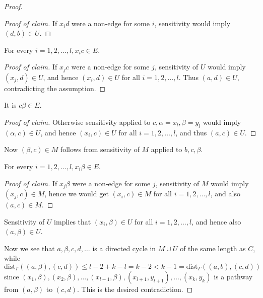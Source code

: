 \begin{proof}
	\begin{proof}[Proof of claim]
		If $x_i d$ were a non-edge for some $i$, sensitivity would imply $(d, b) \in U$.
	\end{proof}
	
	\begin{claim}
		For every $i = 1, 2, \dots , l, x_i c \in E$.
	\end{claim}
	
	\begin{proof}[Proof of claim]
		If $x_j c$ were a non-edge for some $j$, sensitivity of $U$ would imply $(x_j , d) \in U$, and hence $(x_i , d) \in U$ for all $i = 1, 2, \dots , l$. Thus $(a, d) \in U$, contradicting the assumption.
	\end{proof}
	
	\begin{claim}
		It is $c\beta \in E$.
	\end{claim}
	
	\begin{proof}[Proof of claim]
		Otherwise sensitivity applied to $c, \alpha = x_l , \beta = y_l$ would imply $(\alpha, c) \in U$, and hence $(x_i , c) \in U$ for all $i = 1, 2, \dots , l$, and thus $(a, c) \in U$.
	\end{proof}
	
	\begin{claim}
		Now $(\beta, c) \in M$ follows from sensitivity of $M$ applied to $b, c, \beta$.
	\end{claim}
	
	\begin{claim}
		For every $i = 1, 2, \dots , l, x_i \beta \in E$.
	\end{claim}
	
	\begin{proof}[Proof of claim]
		If $x_j \beta$ were a non-edge for some $j$, sensitivity of $M$ would imply $(x_j , c) \in M$, hence we would get $(x_i , c) \in M$ for all $i = 1, 2, \dots , l$, and also $(a, c) \in M$.
	\end{proof}
	
	\begin{claim}
		Sensitivity of $U$ implies that $(x_i , \beta) \in U$ for all $i = 1, 2, \dots , l$, and hence also $(a, \beta) \in U$.
	\end{claim}

	Now we see that $a, \beta, c, d, \dots$ is a directed cycle in $M \cup U$ of the same length as $C$, while $\text{dist}_\Gamma ((a, \beta), (c, d)) \leq l - 2 + k - l = k - 2 < k - 1 = \text{dist}_\Gamma ((a, b), (c, d))$ since $(x_1 , \beta), (x_2 , \beta), \dots , (x_{l-1} , \beta), (x_{l+1} , y_{l+1}), \dots , (x_k , y_k )$ is a pathway from $(a, \beta)$ to $(c, d)$. This is the desired contradiction.
\end{proof}

